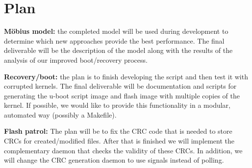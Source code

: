 \section{Plan}

\textbf{M\"obius model:} the completed model will be used during development to
determine which new approaches provide the best performance.  The final
deliverable will be the description of the model along with the results of the
analysis of our improved boot/recovery process.

\textbf{Recovery/boot:} the plan is to finish developing the script and then
test it with corrupted kernels.  The final deliverable will be documentation and
scripts for generating the u-boot script image and flash image with multiple
copies of the kernel.  If possible, we would like to provide this functionality
in a modular, automated way (possibly a Makefile).

\textbf{Flash patrol:} The plan will be to fix the CRC code that is needed to
store CRCs for created/modified files. After that is finished we will implement
the complementary daemon that checks the validity of these CRCs. In addition, we
will change the CRC generation daemon to use signals instead of polling.
